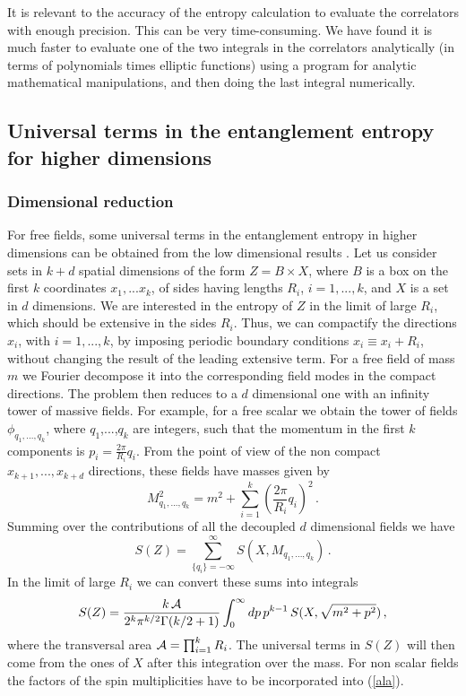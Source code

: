 \documentclass[11pt]{article}
\begin{document}
\noindent
It is relevant to the accuracy of the entropy calculation to evaluate the correlators with enough precision. This can be very time-consuming. We have found it is much faster to evaluate one of the two integrals in the correlators analytically (in terms of polynomials times elliptic functions) using a program for analytic mathematical manipulations, and then doing the last integral numerically.


\subsection{Universal terms in the entanglement entropy for higher dimensions}
\subsubsection{Dimensional reduction}
For free fields, some universal terms in the entanglement entropy in higher dimensions can be obtained from the low dimensional results \cite{boson}. Let us consider sets in $k+d$ spatial dimensions of the form $Z=B\times X$, where $B$ is a box on the first $k$ coordinates $x_1,...x_k$, of sides having lengths $R_i$, $i=1,...,k$, and $X$ is a set in $d$ dimensions. 
We are interested in the entropy of $Z$ in the limit of large $R_i$, which should be extensive in the sides $R_i$. Thus, we can compactify the directions $x_i$, with $i=1,...,k$, by imposing periodic boundary conditions $x_i\equiv x_i+R_i$, without changing the result of the leading extensive term. For a free field of mass $m$ we Fourier decompose it into the corresponding field modes in the compact directions. The problem then reduces to a $d$ dimensional one with an infinity tower of massive fields. For example, for a free scalar we obtain the tower of fields $\phi_{q_1, ..., q_{k}}$, where $q_1$,...,$q_{k}$ are integers, such that the momentum in the first $k$ components is $p_i=\frac{2\pi}{R_i}q_i$. 
From the point of view of the non compact $x_{k+1},..., x_{k+d}$ directions, these fields have masses given by 
\begin{equation}
M_{q_1, ..., q_{k}}^2=m^2+\sum_{i=1}^{k} \left(\frac{2\pi}{R_i}q_i \right) ^2\,. 
\end{equation}
Summing over the contributions of all the decoupled $d$ dimensional fields we have
\begin{equation}
S(Z)=\sum_{\{q_i\}=-\infty}^\infty S(X,M_{q_1, ..., q_{k}})\,.
\end{equation}
In the limit of large $R_i$ we can convert these sums into integrals
\begin{equation}
S(Z)= \frac{k\,{\cal A}}{2^{k}\pi^{k/2}\Gamma(k/2+1)}\int_0^\infty dp\, p^{k-1}\, S(X,\sqrt{m^2+p^2})\,,\label{ala}
\end{equation}
where the transversal area ${\cal A}=\prod_{i=1}^k R_i$.
The universal terms in $S(Z)$ will then come from the ones of $X$ after this integration over the mass. For non scalar fields the factors of the spin multiplicities have to be incorporated into (\ref{ala}).  
\end{document}
